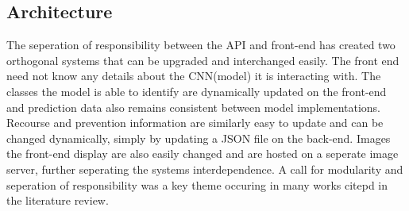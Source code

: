   \subsection{Architecture}
    The seperation of responsibility between the API and front-end has created two orthogonal systems that can be upgraded and interchanged easily. The front end need not know any details about the CNN(model) it is interacting with. The classes the model is able to identify are dynamically updated on the front-end and prediction data also remains consistent between model implementations. Recourse and prevention information are similarly easy to update and can be changed dynamically, simply by updating a JSON file on the back-end. Images the front-end display are also easily changed and are hosted on a seperate image server, further seperating the systems interdependence. A call for modularity and seperation of responsibility was a key theme occuring in many works citepd in the literature review.


